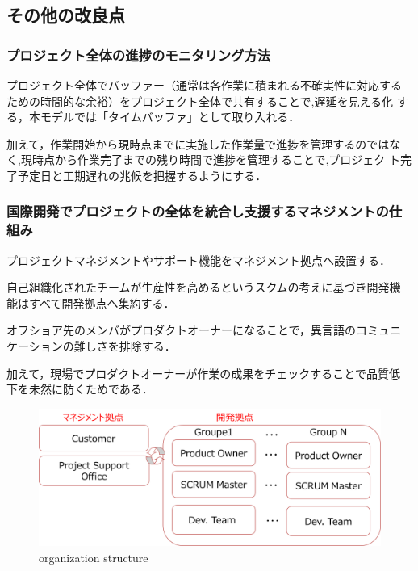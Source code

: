 \documentclass[a4j, 12Q, twocolumn, twoside]{jsarticle}
\begin{document}
\subsection{その他の改良点}

\subsubsection{プロジェクト全体の進捗のモニタリング方法}
プロジェクト全体でバッファー（通常は各作業に積まれる不確実性に対応する
ための時間的な余裕）をプロジェクト全体で共有することで,遅延を見える化
する，本モデルでは「タイムバッファ」として取り入れる．

加えて，作業開始から現時点までに実施した作業量で進捗を管理するのではな
く,現時点から作業完了までの残り時間で進捗を管理することで,プロジェク
ト完了予定日と工期遅れの兆候を把握するようにする．

\subsubsection{国際開発でプロジェクトの全体を統合し支援するマネジメントの仕組み}
プロジェクトマネジメントやサポート機能をマネジメント拠点へ設置する．

自己組織化されたチームが生産性を高めるというスクムの考えに基づき開発機
能はすべて開発拠点へ集約する．

オフショア先のメンバがプロダクトオーナーになることで，異言語のコミュニ
ケーションの難しさを排除する．

加えて，現場でプロダクトオーナーが作業の成果をチェックすることで品質低
下を未然に防くためである．

\begin{figure}[htb]
  \begin{center}
    \includegraphics[width=\columnwidth]{./figures/organization_model.png}
    \caption{organization structure}
  \end{center}
\end{figure}
\end{document}
